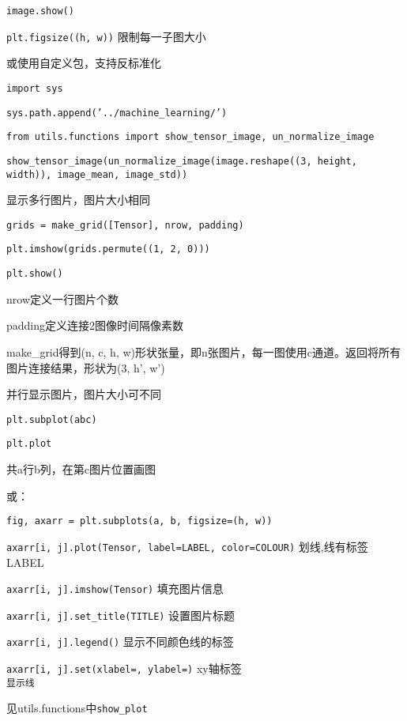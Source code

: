 \documentclass[UTF8]{ctexart}
\begin{document}
  \texttt{image.show()}
  
  \texttt{plt.figsize((h, w))} 限制每一子图大小

  或使用自定义包，支持反标准化

  \texttt{import sys}

  \texttt{sys.path.append('../machine\_learning/')}

  \texttt{from utils.functions import show\_tensor\_image, un\_normalize\_image}

  \texttt{show\_tensor\_image(un\_normalize\_image(image.reshape((3, height, width)), image\_mean, image\_std))}

  显示多行图片，图片大小相同

  \quad \texttt{grids = make\_grid([Tensor], nrow, padding)}

  \quad \texttt{plt.imshow(grids.permute((1, 2, 0)))}

  \quad \texttt{plt.show()}
  
  \quad \quad nrow定义一行图片个数

  \quad \quad padding定义连接2图像时间隔像素数

  \quad \quad make\_grid得到(n, c, h, w)形状张量，即n张图片，每一图使用c通道。返回将所有图片连接结果，形状为(3, h', w')

  并行显示图片，图片大小可不同

  \quad \quad \texttt{plt.subplot(abc)}

  \quad \quad \texttt{plt.plot}

  \quad \quad \quad 共a行b列，在第c图片位置画图

  \quad 或：

  \quad \quad \texttt{fig, axarr = plt.subplots(a, b, figsize=(h, w))}

  \quad \quad \texttt{axarr[i, j].plot(Tensor, label=LABEL, color=COLOUR)} 划线,线有标签LABEL

  \quad \quad \texttt{axarr[i, j].imshow(Tensor)} 填充图片信息

  \quad \quad \texttt{axarr[i, j].set\_title(TITLE)} 设置图片标题

  \quad \quad \texttt{axarr[i, j].legend()} 显示不同颜色线的标签

  \quad \quad \texttt{axarr[i, j].set(xlabel=, ylabel=)} xy轴标签\\
\texttt{显示线}

  见utils.functions中\texttt{show\_plot}

\end{document}
